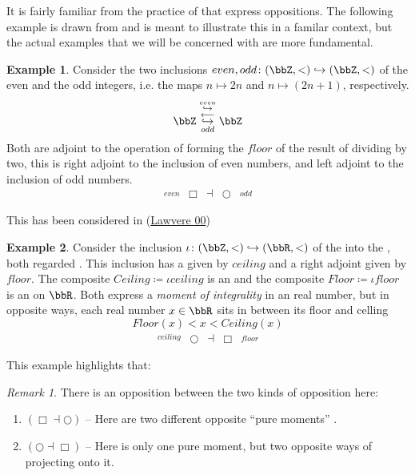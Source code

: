 \documentclass[12pt,titlepage]{article}
\newcommand{\itexarray}[1]{\begin{matrix}#1\end{matrix}}
\newcommand{\lt}{<}
\theoremstyle{plain}
\theoremstyle{definition}
\newtheorem{example}{Example}
\theoremstyle{remark}
\newtheorem{remark}{Remark}
\begin{document}
It is fairly familiar from the practice of  that  express oppositions. The following example is drawn from  and is meant to illustrate this in a familar context, but the actual examples that we will be concerned with are more fundamental.
\begin{example}
\label{}\hypertarget{}{}
Consider the two inclusions $even, odd \colon (\bbZ,\lt ) \hookrightarrow (\bbZ,\lt)$ of the even and the odd integers, i.e. the maps $n \mapsto 2 n$ and $n \mapsto (2n+1)$, respectively.
\begin{displaymath}
\bbZ
\stackrel{\overset{even}{\hookrightarrow}}{\stackrel{\longleftarrow}{\underset{odd}{\hookrightarrow}}}
\bbZ
\end{displaymath}
Both are adjoint to the operation of forming the $floor$ of the result of dividing by two, this is right adjoint to the inclusion of even numbers, and left adjoint to the inclusion of odd numbers.
\begin{displaymath}
\itexarray{
\stackrel{even}{} & \Box &\dashv& \bigcirc & \stackrel{odd}{}
}
\end{displaymath}
\end{example}
This has been considered in (\href{http://ncatlab.org/nlab/show/Aufhebung#Law00}{Lawvere 00})
\begin{example}
\label{}\hypertarget{}{}
Consider the inclusion $\iota \colon (\bbZ, \lt) \hookrightarrow (\bbR, \lt)$ of the  into the , both regarded . This inclusion has a  given by $ceiling$ and a right adjoint given by $floor$. The composite $Ceiling \coloneqq \iota ceiling$ is an  and the composite $Floor \coloneqq \iota floor$ is an  on $\bbR$. Both express a \emph{moment of integrality} in an real number, but in opposite ways, each real number $x\in \bbR$ sits in between its floor and celling
\begin{displaymath}
Floor(x) \lt x \lt Ceiling(x)
\end{displaymath}
\begin{displaymath}
\itexarray{
\stackrel{ceiling}{} &\bigcirc &\dashv& \Box & \stackrel{floor}{}
}
\end{displaymath}
\end{example}
This example highlights that:
\begin{remark}
\label{TheTwoKindsOfOpposites}\hypertarget{TheTwoKindsOfOpposites}{}
There is an opposition between the two kinds of opposition here:
\begin{enumerate}%
\item $(\Box \dashv \bigcirc)$ -- Here are two different opposite ``pure moments'' .
\item $(\bigcirc \dashv \Box)$ -- Here is only one pure moment, but two opposite ways of projecting onto it.
\end{enumerate}
\end{remark}
\end{document}
